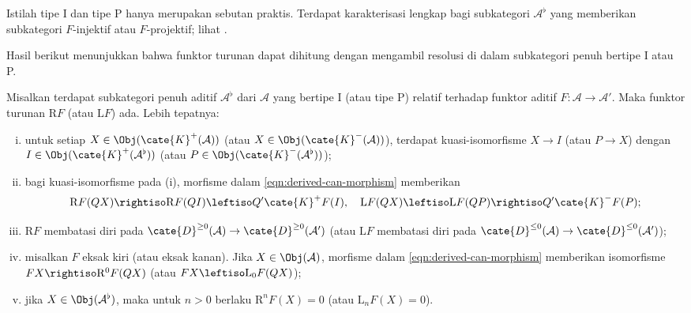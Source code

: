 Istilah tipe I dan tipe P hanya merupakan sebutan praktis. Terdapat
karakterisasi lengkap bagi subkategori $\mathcal{A}^\flat$ yang memberikan
subkategori $F$-injektif atau $F$-projektif; lihat
\cite[Proposisi 13.3.5]{KS06}.

Hasil berikut menunjukkan bahwa funktor turunan dapat dihitung dengan
mengambil resolusi di dalam subkategori penuh bertipe I atau P.

\begin{teorema}\label{prop:derived-via-resolution}
	Misalkan terdapat subkategori penuh aditif $\mathcal{A}^\flat$ dari
	$\mathcal{A}$ yang bertipe I (atau tipe P) relatif terhadap funktor aditif
	$F:\mathcal{A}\to\mathcal{A}'$. Maka funktor turunan $\mathrm{R}F$ (atau
	$\mathrm{L}F$) ada. Lebih tepatnya:
	\begin{enumerate}[(i)]
		\item untuk setiap $X\in\Obj(\cate{K}^+(\mathcal{A}))$ (atau
		$X\in\Obj(\cate{K}^-(\mathcal{A}))$), terdapat kuasi-isomorfisme
		$X\to I$ (atau $P\to X$) dengan
		$I\in\Obj(\cate{K}^+(\mathcal{A}^\flat))$ (atau
		$P\in\Obj(\cate{K}^-(\mathcal{A}^\flat))$);
		\item bagi kuasi-isomorfisme pada (i), morfisme dalam
		\eqref{eqn:derived-can-morphism} memberikan
		\[ \mathrm{R}F(QX) \rightiso \mathrm{R}F(QI) \leftiso Q' \cate{K}^+ F(I), \quad \mathrm{L}F(QX) \leftiso \mathrm{L}F(QP) \rightiso Q' \cate{K}^- F(P); \]
		\item $\mathrm{R}F$ membatasi diri pada
		$\cate{D}^{\geq0}(\mathcal{A})\to\cate{D}^{\geq0}(\mathcal{A}')$
		(atau $\mathrm{L}F$ membatasi diri pada
		$\cate{D}^{\leq0}(\mathcal{A})\to\cate{D}^{\leq0}(\mathcal{A}')$);
		\item misalkan $F$ eksak kiri (atau eksak kanan). Jika
		$X\in\Obj(\mathcal{A})$, morfisme dalam
		\eqref{eqn:derived-can-morphism} memberikan isomorfisme
		$FX\rightiso\mathrm{R}^0F(QX)$ (atau
		$FX\leftiso\mathrm{L}_0F(QX)$);
		\item jika $X\in\Obj(\mathcal{A}^\flat)$, maka untuk $n>0$ berlaku
		$\mathrm{R}^nF(X)=0$ (atau $\mathrm{L}_nF(X)=0$).
	\end{enumerate}
\end{teorema}
